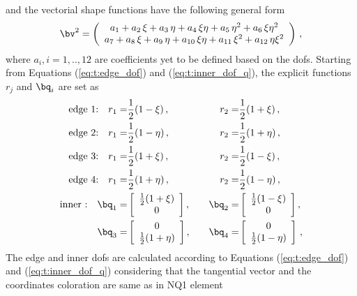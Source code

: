 and the vectorial shape functions have the following general form 
\begin{equation}
\bv^2 =  \left( \begin{array}{c}
a_1 + a_2 \,\xi + a_3\, \eta + a_4\, \xi \eta + a_5\, \eta^2 +  a_6 \, \xi \eta^2 \\ a_7 + a_8 \, \xi + a_9 \, \eta +  a_{10} \, \xi \eta + a_{11} \, \xi^2 + a_{12}  \,\eta \xi^2
\end{array} \right) \,,
\end{equation}
where $a_i, i=1,..,12$ are coefficients yet to be defined based on the dofs. Starting from Equations  (\ref{eq:t:edge_dof}) and (\ref{eq:t:inner_dof_q}), the explicit functions $r_j$ and $\bq_i$ are set as 
\begin{equation}
 \begin{aligned}
\textrm{edge 1:} \quad  r_1 =& \frac{1}{2}  (1- \xi)\,, \quad &r_2 =&\frac{1}{2}  (1+ \xi)\,, \\
\textrm{edge 2:} \quad r_1 =& \frac{1}{2}  (1- \eta)\,,  \quad &r_2 =&\frac{1}{2}  (1+ \eta)\,, \\
\textrm{edge 3:} \quad r_1 =& \frac{1}{2}  (1+ \xi)\,, \quad &r_2 =&\frac{1}{2}  (1- \xi)\,, \\
\textrm{edge 4:} \quad r_1 =& \frac{1}{2}  (1+ \eta)\,,\quad &r_2 =&\frac{1}{2}  (1- \eta)\,, \\
\textrm{inner :} \quad \bq_1 =& \left[ \begin{array}{c}
\frac{1}{2}  (1+ \xi) \\
0 
  \end{array} \right] , \quad &\bq_2 =&\left[ \begin{array}{c}
\frac{1}{2}  (1- \xi) \\
0 
  \end{array} \right] , \\ \bq_3 =& 
  \left[ \begin{array}{c}
0 \\
 \frac{1}{2}  (1+ \eta) 
  \end{array} \right] , \quad &\bq_4 =&\left[ \begin{array}{c}
0 \\
 \frac{1}{2}  (1- \eta) 
  \end{array} \right]
 \,,
  \end{aligned}
\end{equation}
The edge and inner dofs are calculated according to Equations  (\ref{eq:t:edge_dof}) and (\ref{eq:t:inner_dof_q})  considering that the tangential vector and the coordinates coloration are same as in NQ1 element
